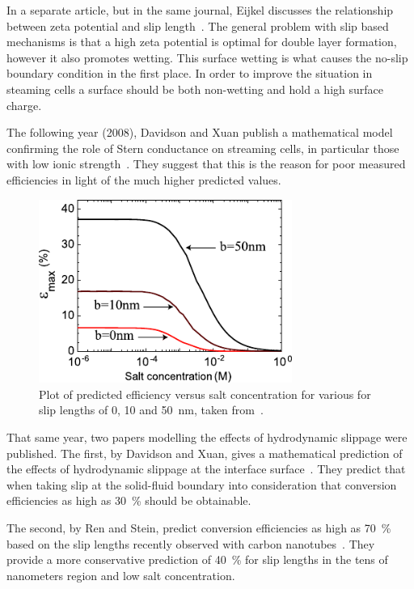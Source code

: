     In a separate article, but in the same journal, Eijkel discusses the relationship between zeta potential and slip length~\cite{Eijkel2007}.
    The general problem with slip based mechanisms is that a high zeta potential is optimal for double layer formation, however it also promotes wetting.
    This surface wetting is what causes the no-slip boundary condition in the first place.
    In order to improve the situation in steaming cells a surface should be both non-wetting and hold a high surface charge.

    The following year (2008), Davidson and Xuan publish a mathematical model confirming the role of Stern conductance on streaming cells, in particular those with low ionic strength~\cite{Davidson2008}.
    They suggest that this is the reason for poor measured efficiencies in light of the much higher predicted values.

    \begin{figure}
      \centering
      \includegraphics[height=6cm]{content/pt1/graphics/SteinSlipEnchancedChannelEfficiency}
      \caption{\label{fig:Stein_Slip_Prediction}Plot of predicted efficiency versus salt concentration for various for slip lengths of 0, 10 and \SI{50}{\nano\meter}, taken from~\cite{Ren2008}.}
    \end{figure}

    That same year, two papers modelling the effects of hydrodynamic slippage were published.
    The first, by Davidson and Xuan, gives a mathematical prediction of the effects of hydrodynamic slippage at the interface surface~\cite{Davidson2008a}.
    They predict that when taking slip at the solid-fluid boundary into consideration that conversion efficiencies as high as \SI{30}{\percent} should be obtainable.

    The second, by Ren and Stein, predict conversion efficiencies as high as \SI{70}{\percent} based on the slip lengths recently observed with carbon nanotubes~\cite{Ren2008}.
    They provide a more conservative prediction of \SI{40}{\percent} for slip lengths in the tens of nanometers region and low salt concentration.

